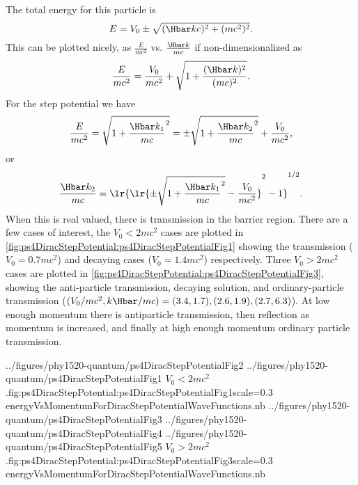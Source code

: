 The total energy for this particle is
%
\begin{dmath}\label{eqn:gradQuantumProblemSet4Problem3:560}
E = V_0 \pm \sqrt{(\Hbar k c)^2 + (m c^2)^2}.
\end{dmath}
%
This can be plotted nicely, as \( \frac{E}{m c^2} \) vs. \( \frac{\Hbar k}{m c} \) if non-dimensionalized as
%
\begin{dmath}\label{eqn:gradQuantumProblemSet4Problem3:580}
\frac{E}{m c^2} = \frac{V_0}{m c^2} + \sqrt{1 + \frac{(\Hbar k)^2}{(m c)^2} }.
\end{dmath}
%
For the step potential we have
%
\begin{dmath}\label{eqn:gradQuantumProblemSet4Problem3:600}
\frac{E}{m c^2}
= \sqrt{ 1 + {\frac{ \Hbar k_1}{m c} }^2 }
= \pm \sqrt{ 1 + {\frac{ \Hbar k_2}{m c} }^2 } + \frac{V_0}{m c^2},
\end{dmath}
%
or
\begin{dmath}\label{eqn:gradQuantumProblemSet4Problem3:620}
\frac{ \Hbar k_2}{m c}
=
\lr{ \lr{ \pm \sqrt{ 1 + {\frac{ \Hbar k_1}{m c} }^2 } - \frac{V_0}{m c^2} }^2 - 1 }^{1/2}.
\end{dmath}
%
When this is real valued, there is transmission in the barrier region.  There are a few cases of interest, the \( V_0 < 2 m c^2 \) cases are plotted in \cref{fig:ps4DiracStepPotential:ps4DiracStepPotentialFig1} showing the transmission (\( V_0 = 0.7 m c^2 \)) and decaying cases (\( V_0 = 1.4 m c^2 \)) respectively.
Three \( V_0 > 2 m c^2 \) cases are plotted in \cref{fig:ps4DiracStepPotential:ps4DiracStepPotentialFig3},
showing the
anti-particle transmission,
decaying solution,
and ordinary-particle transmission
(\( (V_0/m c^2,k \Hbar/m c) = (3.4,1.7), (2.6,1.9), (2.7,6.3) \)).  At low enough momentum there is antiparticle transmission, then reflection as momentum is increased, and finally at high enough momentum ordinary particle transmission.

\mathImageTwoFigures
{../figures/phy1520-quantum/ps4DiracStepPotentialFig2}
{../figures/phy1520-quantum/ps4DiracStepPotentialFig1}
{\( V_0 < 2 m c^2 \).}{fig:ps4DiracStepPotential:ps4DiracStepPotentialFig1}{scale=0.3}
{energyVsMomentumForDiracStepPotentialWaveFunctions.nb}
\mathImageThreeFiguresOneLine
{../figures/phy1520-quantum/ps4DiracStepPotentialFig3}
{../figures/phy1520-quantum/ps4DiracStepPotentialFig4}
{../figures/phy1520-quantum/ps4DiracStepPotentialFig5}
{\( V_0 > 2 m c^2 \).}{fig:ps4DiracStepPotential:ps4DiracStepPotentialFig3}{scale=0.3}
{energyVsMomentumForDiracStepPotentialWaveFunctions.nb}

